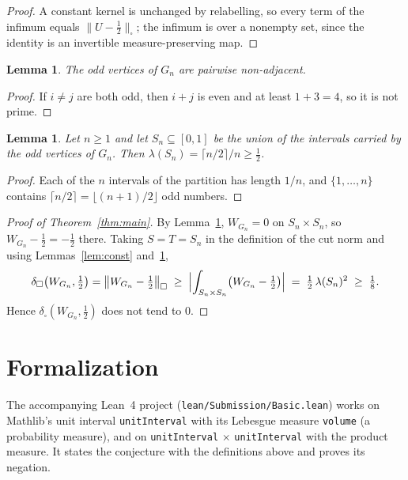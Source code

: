 \documentclass[11pt]{article}
\theoremstyle{plain}
\newtheorem{lemma}[theorem]{Lemma}
\theoremstyle{definition}
\theoremstyle{remark}
\newcommand{\cut}{\square}
\newcommand{\dcut}{\delta_\square}
\begin{document}
\begin{proof}
A constant kernel is unchanged by relabelling, so every term of the infimum
equals $\|U-\frac12\|_\cut$; the infimum is over a nonempty set, since the
identity is an invertible measure-preserving map.
\end{proof}

\begin{lemma}\label{lem:odd}
The odd vertices of $G_n$ are pairwise non-adjacent.
\end{lemma}

\begin{proof}
If $i\ne j$ are both odd, then $i+j$ is even and at least $1+3=4$, so it is not
prime.
\end{proof}

\begin{lemma}\label{lem:measure}
Let $n\ge1$ and let $S_n\subseteq[0,1]$ be the union of the intervals carried by
the odd vertices of $G_n$. Then $\lambda(S_n)=\lceil n/2\rceil/n\ge\tfrac12$.
\end{lemma}

\begin{proof}
Each of the $n$ intervals of the partition has length $1/n$, and
$\{1,\ldots,n\}$ contains $\lceil n/2\rceil=\lfloor (n+1)/2\rfloor$ odd
numbers.
\end{proof}

\begin{proof}[Proof of Theorem~\ref{thm:main}]
By Lemma~\ref{lem:odd}, $W_{G_n}=0$ on $S_n\times S_n$, so
$W_{G_n}-\tfrac12=-\tfrac12$ there. Taking $S=T=S_n$ in the definition of the
cut norm and using Lemmas~\ref{lem:const} and~\ref{lem:measure},
\[
  \dcut\bigl(W_{G_n},\tfrac12\bigr)=\bigl\|W_{G_n}-\tfrac12\bigr\|_\cut
  \;\ge\;\Bigl|\int_{S_n\times S_n}\bigl(W_{G_n}-\tfrac12\bigr)\Bigr|
  \;=\;\tfrac12\,\lambda(S_n)^2\;\ge\;\tfrac18 .
\]
Hence $\dcut(W_{G_n},\frac12)$ does not tend to $0$.
\end{proof}

\section{Formalization}

The accompanying Lean~4 project (\texttt{lean/Submission/Basic.lean}) works on
Mathlib's unit interval \texttt{unitInterval} with its Lebesgue measure
\texttt{volume} (a probability measure), and on \texttt{unitInterval}
$\times$ \texttt{unitInterval} with the product measure. It states the
conjecture with the definitions above and proves its negation.
\end{document}
